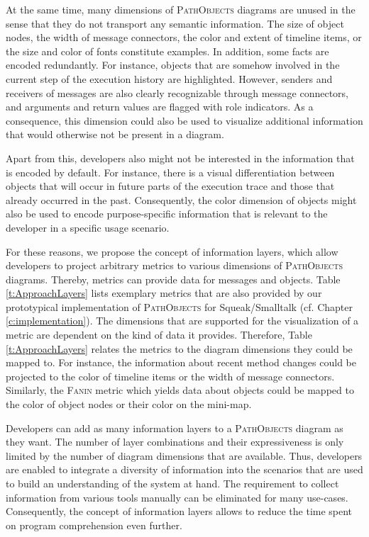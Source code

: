At the same time, many dimensions of \textsc{PathObjects} diagrams are unused in the sense that they do not transport any semantic information.
The size of object nodes, the width of message connectors, the color and extent of timeline items, or the size and color of fonts constitute examples.
In addition, some facts are encoded redundantly.
For instance, objects that are somehow involved in the current step of the execution history are highlighted.
However, senders and receivers of messages are also clearly recognizable through  message connectors, and arguments and return values are flagged with role indicators.
As a consequence, this dimension could also be used to visualize additional information that would otherwise not be present in a diagram.

Apart from this, developers also might not be interested in the information that is encoded by default.
For instance, there is a visual differentiation between objects that will occur in future parts of the execution trace and those that already occurred in the past.
Consequently, the color dimension of objects might also be used to encode purpose-specific information that is relevant to the developer in a specific usage scenario.

For these reasons, we propose the concept of information layers, which allow developers to project arbitrary metrics to various dimensions of \textsc{PathObjects} diagrams.
Thereby, metrics can provide data for messages and objects.
Table \ref{t:ApproachLayers} lists exemplary metrics that are also provided by our prototypical implementation of \textsc{PathObjects} for Squeak/Smalltalk (cf. Chapter \ref{c:implementation}).
The dimensions that are supported for the visualization of a metric are dependent on the kind of data it provides.
Therefore, Table \ref{t:ApproachLayers} relates the metrics to the diagram dimensions they could be mapped to.
For instance, the information about recent method changes could be projected to the color of timeline items or the width of message connectors.
Similarly, the \textsc{Fanin} metric which yields data about objects could be mapped to the color of object nodes or their color on the mini-map.

Developers can add as many information layers to a \textsc{PathObjects} diagram as they want.
The number of layer combinations and their expressiveness is only limited by the number of diagram dimensions that are available.
Thus, developers are enabled to integrate a diversity of information into the scenarios that are used to build an understanding of the system at hand.
The requirement to collect information from various tools manually can be eliminated for many use-cases.
Consequently, the concept of information layers allows to reduce the time spent on program comprehension even further.

